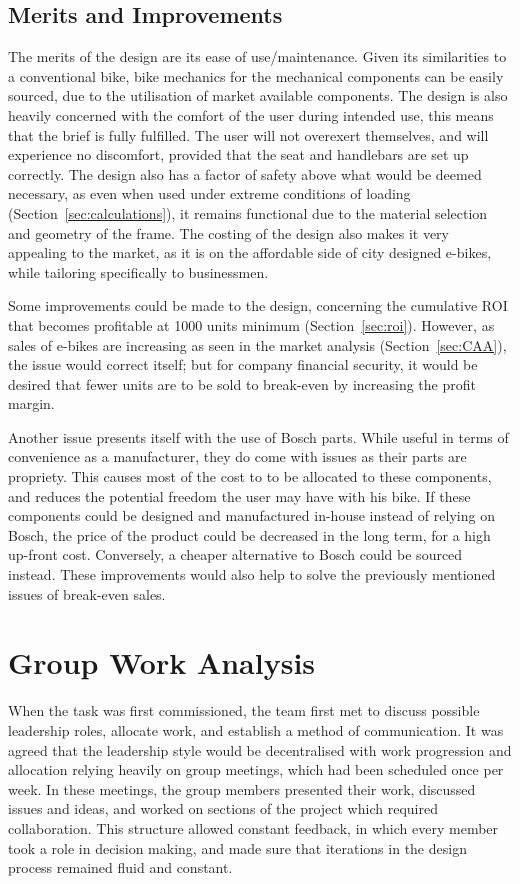 \documentclass[a4paper,11pt]{article}
\begin{document}
\subsection{Merits and Improvements}

The merits of the design are its ease of use/maintenance. Given its similarities to a conventional bike, bike mechanics for the mechanical components can be easily sourced, due to the utilisation of market available components. The design is also heavily concerned with the comfort of the user during intended use, this means that the brief is fully fulfilled. The user will not overexert themselves, and will experience no discomfort, provided that the seat and handlebars are set up correctly. The design also has a factor of safety above what would be deemed necessary, as even when used under extreme conditions of loading (Section~\ref{sec:calculations}), it remains functional due to the material selection and geometry of the frame. The costing of the design also makes it very appealing to the market, as it is on the affordable side of city designed e-bikes, while tailoring specifically to businessmen.

Some improvements could be made to the design, concerning the cumulative ROI that becomes profitable at 1000 units minimum (Section~\ref{sec:roi}). However, as sales of e-bikes are increasing as seen in the market analysis (Section~\ref{sec:CAA}), the issue would correct itself; but for company financial security, it would be desired that fewer units are to be sold to break-even by increasing the profit margin. 

Another issue presents itself with the use of Bosch parts. While useful in terms of convenience as a manufacturer, they do come with issues as their parts are propriety. This causes most of the cost to to be allocated to these components, and reduces the potential freedom the user may have with his bike. If these components could be designed and manufactured in-house instead of relying on Bosch, the price of the product could be decreased in the long term, for a high up-front cost. Conversely, a cheaper alternative to Bosch could be sourced instead. These improvements would also help to solve the previously mentioned issues of break-even sales. 


\section{Group Work Analysis}

When the task was first commissioned, the team first met to discuss possible leadership roles, allocate work, and establish a method of communication. It was agreed that the leadership style would be decentralised with work progression and allocation relying heavily on group meetings, which had been scheduled once per week. In these meetings, the group members presented their work, discussed issues and ideas, and worked on sections of the project which required collaboration. This structure allowed constant feedback, in which every member took a role in decision making, and made sure that iterations in the design process remained fluid and constant. 
\end{document}
